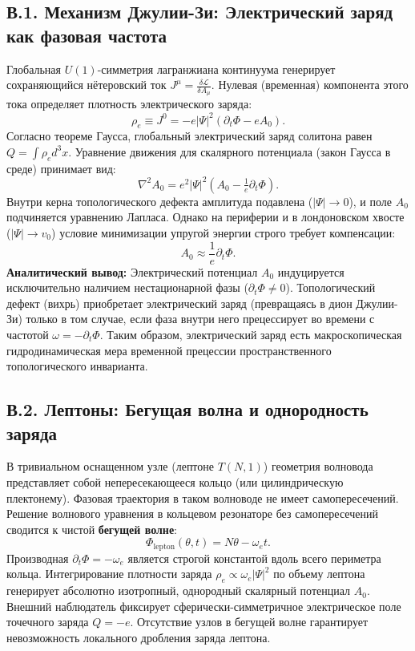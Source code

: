 \documentclass[11pt,a4paper]{article}
\begin{document}
	\subsection*{В.1. Механизм Джулии-Зи: Электрический заряд как фазовая частота}
	Глобальная $U(1)$-симметрия лагранжиана континуума генерирует сохраняющийся нётеровский ток $J^\mu = \frac{\delta \mathcal{L}}{\delta A_\mu}$. Нулевая (временная) компонента этого тока определяет плотность электрического заряда:
	\begin{equation}
		\rho_e \equiv J^0 = -e |\Psi|^2 (\partial_t \Phi - e A_0).
	\end{equation}
	Согласно теореме Гаусса, глобальный электрический заряд солитона равен $Q = \int \rho_e d^3x$. Уравнение движения для скалярного потенциала (закон Гаусса в среде) принимает вид:
	\begin{equation}
		\nabla^2 A_0 = e^2 |\Psi|^2 (A_0 - \tfrac{1}{e}\partial_t \Phi).
	\end{equation}
	Внутри керна топологического дефекта амплитуда подавлена ($|\Psi| \to 0$), и поле $A_0$ подчиняется уравнению Лапласа. Однако на периферии и в лондоновском хвосте ($|\Psi| \to v_0$) условие минимизации упругой энергии строго требует компенсации:
	\begin{equation}
		A_0 \approx \frac{1}{e} \partial_t \Phi.
	\end{equation}
	\textbf{Аналитический вывод:} Электрический потенциал $A_0$ индуцируется исключительно наличием нестационарной фазы ($\partial_t \Phi \neq 0$). Топологический дефект (вихрь) приобретает электрический заряд (превращаясь в дион Джулии-Зи) только в том случае, если фаза внутри него прецессирует во времени с частотой $\omega = -\partial_t \Phi$. Таким образом, электрический заряд есть макроскопическая гидродинамическая мера временной прецессии пространственного топологического инварианта.
	
	\subsection*{В.2. Лептоны: Бегущая волна и однородность заряда}
	В тривиальном оснащенном узле (лептоне $T(N,1)$) геометрия волновода представляет собой непересекающееся кольцо (или цилиндрическую плектонему). Фазовая траектория в таком волноводе не имеет самопересечений.
	Решение волнового уравнения в кольцевом резонаторе без самопересечений сводится к чистой \textbf{бегущей волне}:
	\begin{equation}
		\Phi_{\text{lepton}}(\theta, t) = N\theta - \omega_e t.
	\end{equation}
	Производная $\partial_t \Phi = -\omega_e$ является строгой константой вдоль всего периметра кольца. 
	Интегрирование плотности заряда $\rho_e \propto \omega_e |\Psi|^2$ по объему лептона генерирует абсолютно изотропный, однородный скалярный потенциал $A_0$. Внешний наблюдатель фиксирует сферически-симметричное электрическое поле точечного заряда $Q = -e$. Отсутствие узлов в бегущей волне гарантирует невозможность локального дробления заряда лептона.
	
\end{document}
